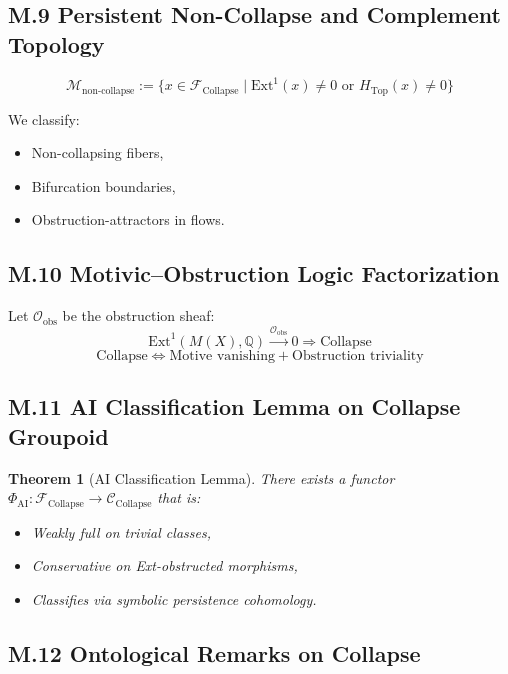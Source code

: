 \documentclass[11pt]{article}
\newtheorem{theorem}{Theorem}[section]
\begin{document}
\begin{axiom}
\begin{axiom}
{{\subsection*{M.9 Persistent Non-Collapse and Complement Topology}

\[
\mathcal{M}_{\text{non-collapse}} := \{ x \in \mathcal{F}_{\text{Collapse}} \mid \mathrm{Ext}^1(x) \neq 0 \text{ or } H_{\text{Top}}(x) \neq 0 \}
\]

We classify:
\begin{itemize}
  \item Non-collapsing fibers,
  \item Bifurcation boundaries,
  \item Obstruction-attractors in flows.
\end{itemize}

\subsection*{M.10 Motivic–Obstruction Logic Factorization}

Let $\mathcal{O}_{\text{obs}}$ be the obstruction sheaf:
\[
\mathrm{Ext}^1(M(X),\mathbb{Q}) \overset{\mathcal{O}_{\text{obs}}}{\longrightarrow} 0 \Rightarrow \text{Collapse}
\]
\[
\text{Collapse} \Longleftrightarrow \text{Motive vanishing} + \text{Obstruction triviality}
\]

\subsection*{M.11 AI Classification Lemma on Collapse Groupoid}

\begin{theorem}[AI Classification Lemma]
There exists a functor $\Phi_{\text{AI}}: \mathcal{F}_{\text{Collapse}} \to \mathcal{C}_{\text{Collapse}}$  
that is:
\begin{itemize}
  \item Weakly full on trivial classes,
  \item Conservative on Ext-obstructed morphisms,
  \item Classifies via symbolic persistence cohomology.
\end{itemize}
\end{theorem}

\subsection*{M.12 Ontological Remarks on Collapse}

}}
\end{axiom}
\end{axiom}
\end{document}
